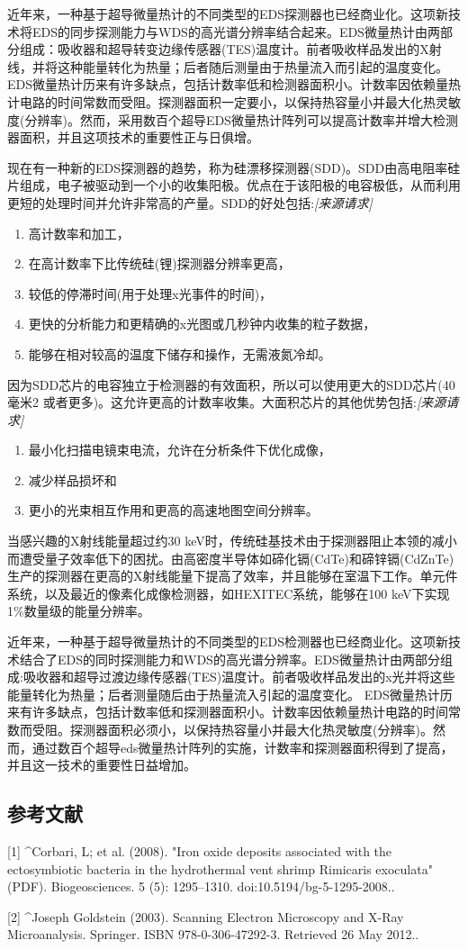 近年来，一种基于超导微量热计的不同类型的EDS探测器也已经商业化。这项新技术将EDS的同步探测能力与WDS的高光谱分辨率结合起来。EDS微量热计由两部分组成：吸收器和超导转变边缘传感器(TES)温度计。前者吸收样品发出的X射线，并将这种能量转化为热量；后者随后测量由于热量流入而引起的温度变化。EDS微量热计历来有许多缺点，包括计数率低和检测器面积小。计数率因依赖量热计电路的时间常数而受阻。探测器面积一定要小，以保持热容量小并最大化热灵敏度(分辨率)。然而，采用数百个超导EDS微量热计阵列可以提高计数率并增大检测器面积，并且这项技术的重要性正与日俱增。

现在有一种新的EDS探测器的趋势，称为硅漂移探测器(SDD)。SDD由高电阻率硅片组成，电子被驱动到一个小的收集阳极。优点在于该阳极的电容极低，从而利用更短的处理时间并允许非常高的产量。SDD的好处包括:\textsl{[来源请求]}
\begin{enumerate}
\item 高计数率和加工，
\item 在高计数率下比传统硅(锂)探测器分辨率更高，
\item 较低的停滞时间(用于处理x光事件的时间)，
\item 更快的分析能力和更精确的x光图或几秒钟内收集的粒子数据，
\item 能够在相对较高的温度下储存和操作，无需液氮冷却。
\end{enumerate}
因为SDD芯片的电容独立于检测器的有效面积，所以可以使用更大的SDD芯片(40 毫米2 或者更多)。这允许更高的计数率收集。大面积芯片的其他优势包括:\textsl{[来源请求]}
\begin{enumerate}
\item 最小化扫描电镜束电流，允许在分析条件下优化成像，
\item 减少样品损坏和
\item 更小的光束相互作用和更高的高速地图空间分辨率。
\end{enumerate}
当感兴趣的X射线能量超过约30 keV时，传统硅基技术由于探测器阻止本领的减小而遭受量子效率低下的困扰。由高密度半导体如碲化镉(CdTe)和碲锌镉(CdZnTe)生产的探测器在更高的X射线能量下提高了效率，并且能够在室温下工作。单元件系统，以及最近的像素化成像检测器，如HEXITEC系统，能够在100 keV下实现1\%数量级的能量分辨率。

近年来，一种基于超导微量热计的不同类型的EDS检测器也已经商业化。这项新技术结合了EDS的同时探测能力和WDS的高光谱分辨率。EDS微量热计由两部分组成:吸收器和超导过渡边缘传感器(TES)温度计。前者吸收样品发出的x光并将这些能量转化为热量；后者测量随后由于热量流入引起的温度变化。 EDS微量热计历来有许多缺点，包括计数率低和探测器面积小。计数率因依赖量热计电路的时间常数而受阻。探测器面积必须小，以保持热容量小并最大化热灵敏度(分辨率)。然而，通过数百个超导eds微量热计阵列的实施，计数率和探测器面积得到了提高，并且这一技术的重要性日益增加。

\subsection{参考文献}
[1]
^Corbari, L; et al. (2008). "Iron oxide deposits associated with the ectosymbiotic bacteria in the hydrothermal vent shrimp Rimicaris exoculata" (PDF). Biogeosciences. 5 (5): 1295–1310. doi:10.5194/bg-5-1295-2008..

[2]
^Joseph Goldstein (2003). Scanning Electron Microscopy and X-Ray Microanalysis. Springer. ISBN 978-0-306-47292-3. Retrieved 26 May 2012..